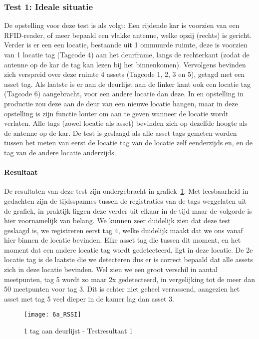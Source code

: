 \subsubsection{Test 1: Ideale situatie}
De opstelling voor deze test is als volgt: Een rijdende kar is voorzien van een RFID-reader, of meer bepaald een vlakke antenne, welke opzij (rechts) is gericht. Verder is er een een locatie, bestaande uit 1 ommuurde ruimte, deze is voorzien van 1 locatie tag (Tagcode 4) aan het deurframe, langs de rechterkant (zodat de antenne op de kar de tag kan lezen bij het binnenkomen). Vervolgens bevinden zich verspreid over deze ruimte 4 assets (Tagcode 1, 2, 3 en 5), getagd met een asset tag. Als laatste is er aan de deurlijst aan de linker kant ook een locatie tag (Tagcode 6) aangebracht, voor een andere locatie dan deze. In en opstelling in productie zou deze aan de deur van een nieuwe locatie hangen, maar in deze opstelling is zijn functie louter om aan te geven wanneer de locatie wordt verlaten. Alle tags (zowel locatie als asset) bevinden zich op dezelfde hoogte als de antenne op de kar. De test is geslaagd als alle asset tags gemeten worden tussen het meten van eerst de locatie tag van de locatie zelf eenderzijds en, en de tag van de andere locatie anderzijds.

\paragraph{Resultaat}
De resultaten van deze test zijn ondergebracht in grafiek~\ref{fig:ond-rfid-dynamic-6a-res}. Met leesbaarheid in gedachten zijn de tijdsspannes tussen de registraties van de tags weggelaten uit de grafiek, in praktijk liggen deze verder uit elkaar in de tijd maar de volgorde is hier voornamelijk van belang. We kunnen zeer duidelijk zien dat deze test geslaagd is, we registreren eerst tag 4, welke duidelijk maakt dat we ons vanaf hier binnen de locatie bevinden. Elke asset tag die tussen dit moment, en het moment dat een andere locatie tag wordt gedetecteerd, ligt in deze locatie. De 2e locatie tag is de laatste die we detecteren dus er is correct bepaald dat alle assets zich in deze locatie bevinden. Wel zien we een groot verschil in aantal meetpunten, tag 5 wordt zo maar 2x gedetecteerd, in vergelijking tot de meer dan 50 meetpunten voor tag 3. Dit is echter niet geheel verrassend, aangezien het asset met tag 5 veel dieper in de kamer lag dan asset 3.

\begin{figure}[h]
	\texttt{[image: 6a\_RSSI]}
	\caption{1 tag aan deurlijst - Testresultaat 1}
	\label{fig:ond-rfid-dynamic-6a-res}
\end{figure}

